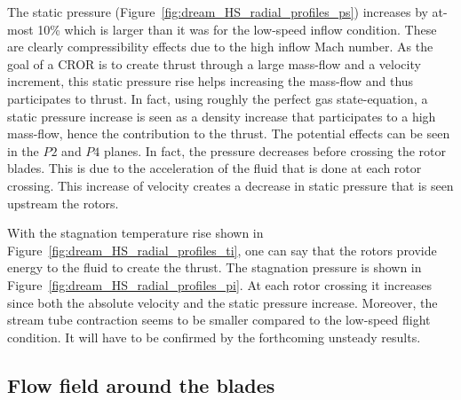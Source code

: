 The static pressure (Figure~\ref{fig:dream_HS_radial_profiles_ps}) increases
by at-most 10\% which is larger than it was for the low-speed
inflow condition. These are clearly compressibility effects due
to the high inflow Mach number. As the goal of a CROR is
to create thrust through a large mass-flow and
a velocity increment, this
static pressure rise helps increasing the mass-flow
and thus participates to thrust.
In fact, using roughly the perfect gas state-equation,
a static pressure increase is seen as a density increase that
participates to a high mass-flow, hence the contribution to the thrust.
The potential effects can be seen in the
$P2$ and $P4$ planes. In fact, the pressure decreases before
crossing the rotor blades. This is due to the acceleration of the
fluid that is done at each rotor crossing. This increase of velocity
creates a decrease in static pressure that is seen upstream the rotors.

With the stagnation temperature rise shown
in Figure~\ref{fig:dream_HS_radial_profiles_ti}, one can say that
the rotors provide energy to the fluid to create the thrust.
The stagnation pressure is shown in Figure~\ref{fig:dream_HS_radial_profiles_pi}.
At each rotor crossing it increases since both the absolute velocity and
the static pressure increase. 
Moreover, the stream tube contraction seems to be smaller
compared to the low-speed flight condition. It will have to be
confirmed by the forthcoming unsteady results.

\subsection{Flow field around the blades}
\label{sub:dream_hs_blades}

